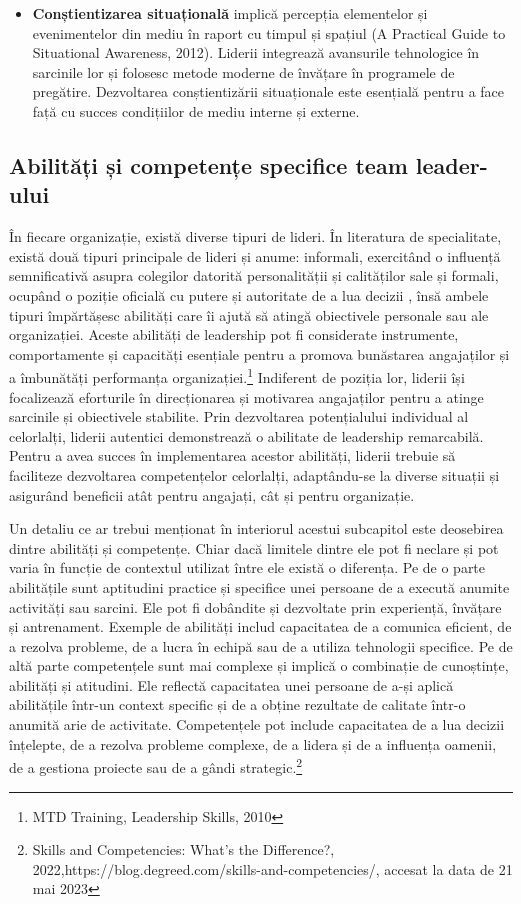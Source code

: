 \documentclass[a4paper, 12pt]{article}
\begin{document}
\begin{itemize}
	\item \textbf{Conștientizarea situațională} implică percepția elementelor și evenimentelor din mediu în raport cu timpul și spațiul (A Practical Guide to Situational Awareness, 2012). Liderii integrează avansurile tehnologice în sarcinile lor și folosesc metode moderne de învățare în programele de pregătire. Dezvoltarea conștientizării situaționale este esențială pentru a face față cu succes condițiilor de mediu interne și externe. 

	\end{itemize}

	\subsection{Abilități și competențe specifice team leader-ului}
	
	\quad\quad În fiecare organizație, există diverse tipuri de lideri. În literatura de specialitate, există două tipuri principale de lideri și anume: informali, exercitând o influență semnificativă asupra colegilor datorită personalității și calităților sale și formali, ocupând o poziție oficială cu putere și autoritate de a lua decizii , însă ambele tipuri împărtășesc abilități care îi ajută să atingă obiectivele personale sau ale organizației. Aceste abilități de leadership pot fi considerate instrumente, comportamente și capacități esențiale pentru a promova bunăstarea angajaților și a îmbunătăți performanța organizației.\footnote{MTD Training, Leadership Skills, 2010} Indiferent de poziția lor, liderii își focalizează eforturile în direcționarea și motivarea angajaților pentru a atinge sarcinile și obiectivele stabilite. Prin dezvoltarea potențialului individual al celorlalți, liderii autentici demonstrează o abilitate de leadership remarcabilă. Pentru a avea succes în implementarea acestor abilități, liderii trebuie să faciliteze dezvoltarea competențelor celorlalți, adaptându-se la diverse situații și asigurând beneficii atât pentru angajați, cât și pentru organizație.

	\quad  Un detaliu ce ar trebui menționat în interiorul acestui subcapitol este deosebirea dintre abilități și competențe. Chiar dacă limitele dintre ele pot fi neclare și pot varia în funcție de contextul utilizat între ele există o diferența. Pe de o parte abilitățile sunt aptitudini practice și specifice unei persoane de a execută anumite activități sau sarcini. Ele pot fi dobândite și dezvoltate prin experiență, învățare și antrenament. Exemple de abilități includ capacitatea de a comunica eficient, de a rezolva probleme, de a lucra în echipă sau de a utiliza tehnologii specifice. Pe de altă parte competențele sunt mai complexe și implică o combinație de cunoștințe, abilități și atitudini. Ele reflectă capacitatea unei persoane de a-și aplică abilitățile într-un context specific și de a obține rezultate de calitate într-o anumită arie de activitate. Competențele pot include capacitatea de a lua decizii înțelepte, de a rezolva probleme complexe, de a lidera și de a influența oamenii, de a gestiona proiecte sau de a gândi strategic.\footnote{Skills and Competencies: What’s the Difference?, 2022,https://blog.degreed.com/skills-and-competencies/, accesat la data de 21 mai 2023}
		
\end{document}

